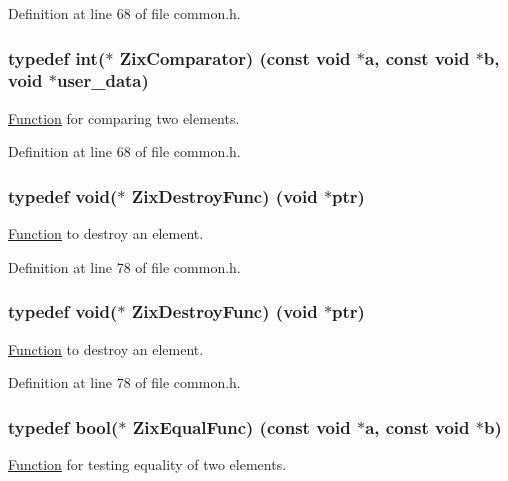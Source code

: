 Definition at line 68 of file common.\+h.

\subsubsection[{\texorpdfstring{Zix\+Comparator}{ZixComparator}}]{\setlength{\rightskip}{0pt plus 5cm}typedef {\bf int}($\ast$ Zix\+Comparator) ({\bf const} {\bf void} $\ast${\bf a}, {\bf const} {\bf void} $\ast${\bf b}, {\bf void} $\ast$user\+\_\+data)}\hypertarget{group__zix_gaa647997c2e16e85391dad2d77c02aff6}{}\label{group__zix_gaa647997c2e16e85391dad2d77c02aff6}
\hyperlink{class_function}{Function} for comparing two elements. 

Definition at line 68 of file common.\+h.

\subsubsection[{\texorpdfstring{Zix\+Destroy\+Func}{ZixDestroyFunc}}]{\setlength{\rightskip}{0pt plus 5cm}typedef {\bf void}($\ast$ Zix\+Destroy\+Func) ({\bf void} $\ast$ptr)}\hypertarget{group__zix_ga116fe3bb614b937a4190ab5fe645cc87}{}\label{group__zix_ga116fe3bb614b937a4190ab5fe645cc87}
\hyperlink{class_function}{Function} to destroy an element. 

Definition at line 78 of file common.\+h.

\subsubsection[{\texorpdfstring{Zix\+Destroy\+Func}{ZixDestroyFunc}}]{\setlength{\rightskip}{0pt plus 5cm}typedef {\bf void}($\ast$ Zix\+Destroy\+Func) ({\bf void} $\ast$ptr)}\hypertarget{group__zix_ga116fe3bb614b937a4190ab5fe645cc87}{}\label{group__zix_ga116fe3bb614b937a4190ab5fe645cc87}
\hyperlink{class_function}{Function} to destroy an element. 

Definition at line 78 of file common.\+h.

\subsubsection[{\texorpdfstring{Zix\+Equal\+Func}{ZixEqualFunc}}]{\setlength{\rightskip}{0pt plus 5cm}typedef {\bf bool}($\ast$ Zix\+Equal\+Func) ({\bf const} {\bf void} $\ast${\bf a}, {\bf const} {\bf void} $\ast${\bf b})}\hypertarget{group__zix_ga4cb30cbc7c5989a17b2b73ee23f63686}{}\label{group__zix_ga4cb30cbc7c5989a17b2b73ee23f63686}
\hyperlink{class_function}{Function} for testing equality of two elements. 


